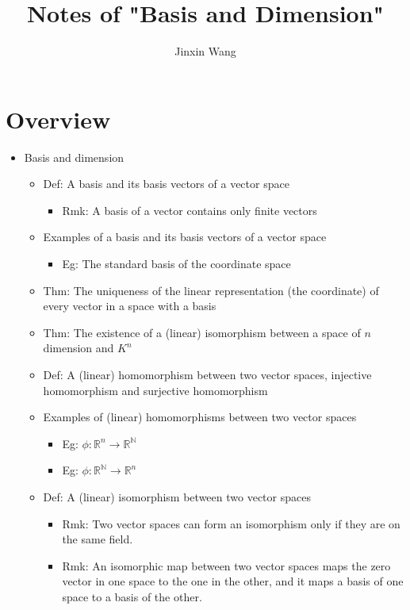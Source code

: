 \documentclass[onecolumn]{ctexart}
\title{Notes of "Basis and Dimension"}
\author{Jinxin Wang}
\date{}
\begin{document}
\maketitle

\section{Overview}
\begin{itemize}
  \item Basis and dimension
  \begin{itemize}
    \item Def: A basis and its basis vectors of a vector space
    \begin{itemize}
      \item Rmk: A basis of a vector contains only finite vectors
    \end{itemize}
    \item Examples of a basis and its basis vectors of a vector space
    \begin{itemize}
      \item Eg: The standard basis of the coordinate space
    \end{itemize}
    \item Thm: The uniqueness of the linear representation (the coordinate) of every vector in a space with a basis
    \item Thm: The existence of a (linear) isomorphism between a space of $n$ dimension and $K^n$
    \item Def: A (linear) homomorphism between two vector spaces, injective homomorphism and surjective homomorphism
    \item Examples of (linear) homomorphisms between two vector spaces
    \begin{itemize}
      \item Eg: $\phi: \mathbb{R}^n \to \mathbb{R}^{\mathbb{N}}$
      \item Eg: $\phi: \mathbb{R}^{\mathbb{N}} \to \mathbb{R}^n$
    \end{itemize}
    \item Def: A (linear) isomorphism between two vector spaces
    \begin{itemize}
      \item Rmk: Two vector spaces can form an isomorphism only if they are on the same field.
      \item Rmk: An isomorphic map between two vector spaces maps the zero vector in one space to the one in the other, and it maps a basis of one space to a basis of the other.

\end{itemize}
\end{itemize}
\end{itemize}
\end{document}
